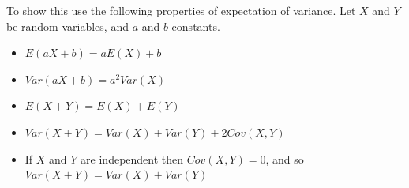 \documentclass[fleqn]{article}\usepackage[]{graphicx}\usepackage[]{color}
\begin{document}
To show this use the following properties of expectation of variance.  Let $X$ and $Y$ be random variables, and $a$ and $b$ constants.
\begin{itemize}
\item $E(aX+b) = aE(X) + b$
\item $Var(aX + b) = a^2 Var(X)$ 
\item $E(X + Y) = E(X) + E(Y)$
\item $Var(X+Y) = Var(X) + Var(Y) + 2Cov(X,Y)$
\item If $X$ and $Y$ are independent then $Cov(X,Y)=0$, and so $Var(X+Y) = Var(X) + Var(Y)$\\
\end{itemize}

% 

 
\end{document}
